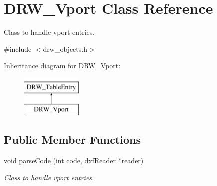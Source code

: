 \hypertarget{class_d_r_w___vport}{}\section{D\+R\+W\+\_\+\+Vport Class Reference}
\label{class_d_r_w___vport}


Class to handle vport entries.  




{\ttfamily \#include $<$drw\+\_\+objects.\+h$>$}

Inheritance diagram for D\+R\+W\+\_\+\+Vport\+:\begin{figure}[H]
\begin{center}
\leavevmode
\includegraphics[height=2.000000cm]{db/daa/class_d_r_w___vport}
\end{center}
\end{figure}
\subsection*{Public Member Functions}
\begin{DoxyCompactItemize}
\item 
void \hyperlink{class_d_r_w___vport_a7f865bb07bda60869ece9c15b7ceb186}{parse\+Code} (int code, dxf\+Reader $\ast$reader)
\begin{DoxyCompactList}\small\item\em Class to handle vport entries. \end{DoxyCompactList}\end{DoxyCompactItemize}

